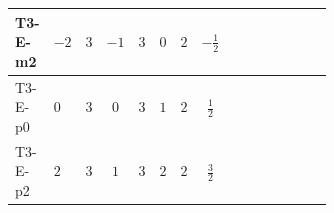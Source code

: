\documentclass[8pt]{article}
\begin{document}
\begin{landscape}
\begin{longtable}{@{}llcccccc >{\raggedright\arraybackslash}p{0.21\linewidth} >{\raggedright\arraybackslash}p{0.21\linewidth} >{\raggedright\arraybackslash}p{0.21\linewidth}@{}}
\midrule
T3-E-m2 & $-2$ & $3$ & $-1$ & $3$ & $0$ & $2$ & $-\frac{1}{2}$ & \scriptsize\adjustbox{max width=\linewidth}{$\begin{gathered} {\lambda_1} (12 \operatorname{Tr}\!\left({Y_d}\,\left({Y_d}\right)^{\dagger}\right)+4 \operatorname{Tr}\!\left({Y_e}\,\left({Y_e}\right)^{\dagger}\right)+12 \operatorname{Tr}\!\left({Y_u}\,\left({Y_u}\right)^{\dagger}\right))\end{gathered}$} & \scriptsize\adjustbox{max width=\linewidth}{$\begin{gathered} -12 \operatorname{Tr}\!\left({Y_d}\,\left({Y_d}\right)^{\dagger}\,{Y_d}\,\left({Y_d}\right)^{\dagger}\right)\end{gathered}$} & \scriptsize\adjustbox{max width=\linewidth}{$\begin{gathered} -4 \operatorname{Tr}\!\left({Y_e}\,\left({Y_e}\right)^{\dagger}\,{Y_e}\,\left({Y_e}\right)^{\dagger}\right)\end{gathered}$} \\
\midrule
T3-E-p0 & $0$ & $3$ & $0$ & $3$ & $1$ & $2$ & $\frac{1}{2}$ & \scriptsize\adjustbox{max width=\linewidth}{$\begin{gathered} {\lambda_1} (12 \operatorname{Tr}\!\left({Y_d}\,\left({Y_d}\right)^{\dagger}\right)+4 \operatorname{Tr}\!\left({Y_e}\,\left({Y_e}\right)^{\dagger}\right)+12 \operatorname{Tr}\!\left({Y_u}\,\left({Y_u}\right)^{\dagger}\right))\end{gathered}$} & \scriptsize\adjustbox{max width=\linewidth}{$\begin{gathered} -12 \operatorname{Tr}\!\left({Y_d}\,\left({Y_d}\right)^{\dagger}\,{Y_d}\,\left({Y_d}\right)^{\dagger}\right)\end{gathered}$} & \scriptsize\adjustbox{max width=\linewidth}{$\begin{gathered} -4 \operatorname{Tr}\!\left({Y_e}\,\left({Y_e}\right)^{\dagger}\,{Y_e}\,\left({Y_e}\right)^{\dagger}\right)\end{gathered}$} \\
\midrule
T3-E-p2 & $2$ & $3$ & $1$ & $3$ & $2$ & $2$ & $\frac{3}{2}$ & \scriptsize\adjustbox{max width=\linewidth}{$\begin{gathered} {\lambda_1} (12 \operatorname{Tr}\!\left({Y_d}\,\left({Y_d}\right)^{\dagger}\right)+4 \operatorname{Tr}\!\left({Y_e}\,\left({Y_e}\right)^{\dagger}\right)+12 \operatorname{Tr}\!\left({Y_u}\,\left({Y_u}\right)^{\dagger}\right))\end{gathered}$} & \scriptsize\adjustbox{max width=\linewidth}{$\begin{gathered} -12 \operatorname{Tr}\!\left({Y_d}\,\left({Y_d}\right)^{\dagger}\,{Y_d}\,\left({Y_d}\right)^{\dagger}\right)\end{gathered}$} & \scriptsize\adjustbox{max width=\linewidth}{$\begin{gathered} -4 \operatorname{Tr}\!\left({Y_e}\,\left({Y_e}\right)^{\dagger}\,{Y_e}\,\left({Y_e}\right)^{\dagger}\right)\end{gathered}$} \\

\end{longtable}
\end{landscape}
\end{document}
